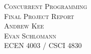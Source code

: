 \begin{titlepage}
\begin{center} 
\vspace*{2cm}
\textsc{\huge Concurrent Programming}\\[1cm]
\textsc{\LARGE Final Project Report}\\[13cm]

\textsc{\large Andrew Kee}\\[0.25cm]
\textsc{\large Evan Schlomann} \\[0.25cm]
\textsc{ECEN 4003 / CSCI 4830}

\end{center}
\end{titlepage}